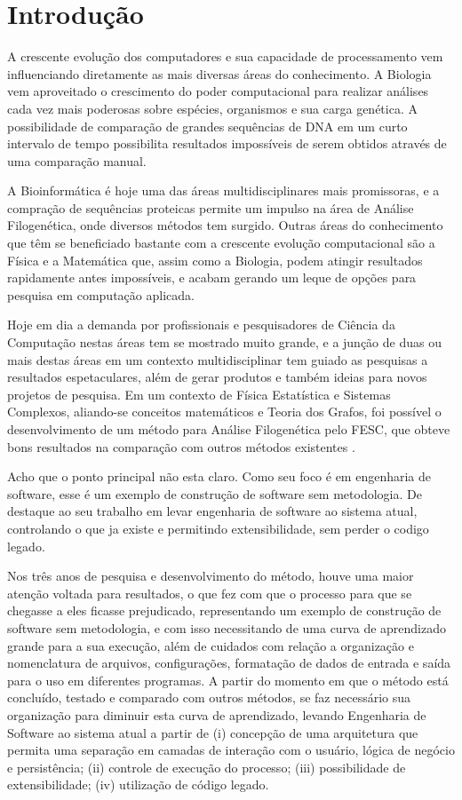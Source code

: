 \chapter{Introdução}

A crescente evolução dos computadores e sua capacidade de processamento vem influenciando diretamente as mais diversas áreas do conhecimento. A Biologia
vem aproveitado o crescimento do poder computacional para realizar análises cada vez mais poderosas sobre espécies, organismos e sua carga genética.
A possibilidade de comparação de grandes sequências de DNA em um curto intervalo de tempo possibilita resultados impossíveis de serem obtidos através
de uma comparação manual.

A Bioinformática é hoje uma das áreas multidisciplinares mais promissoras, e a compração de sequências proteicas permite um impulso na área de Análise
Filogenética, onde diversos métodos tem surgido. Outras áreas do conhecimento que têm se beneficiado bastante com a crescente evolução computacional são a
Física e a Matemática que, assim como a Biologia, podem atingir resultados rapidamente antes impossíveis, e acabam gerando um leque de opções para pesquisa
em computação aplicada.

Hoje em dia a demanda por profissionais e pesquisadores de Ciência da Computação nestas áreas tem se mostrado muito grande, e a junção de duas ou mais destas
áreas em um contexto multidisciplinar tem guiado as pesquisas a resultados espetaculares, além de gerar produtos e também ideias para novos projetos de
pesquisa. Em um contexto de Física Estatística e Sistemas Complexos, aliando-se conceitos matemáticos \cite{andrade2009} e Teoria dos Grafos, foi possível o
desenvolvimento de um método para Análise Filogenética pelo FESC, que obteve bons resultados na comparação com outros métodos existentes \cite{andrade2011}.


Acho que o ponto principal não esta claro. Como seu foco é em engenharia de software, esse é um exemplo de construção de software sem metodologia.
De destaque ao seu trabalho em levar engenharia de software ao sistema atual, controlando o que ja existe e permitindo extensibilidade, sem perder
o codigo legado.


Nos três anos de pesquisa e desenvolvimento do método, houve uma maior atenção voltada para resultados, o que fez com que o processo para que se chegasse
a eles ficasse prejudicado, representando um exemplo de construção de software sem metodologia, e com isso necessitando de uma curva de aprendizado grande
para a sua execução, além de cuidados com relação a organização e nomenclatura de arquivos, configurações, formatação de dados de entrada e saída para o
uso em diferentes programas. A partir do momento em que o método está concluído, testado e comparado com outros métodos, se faz necessário sua organização
para diminuir esta curva de aprendizado, levando Engenharia de Software ao sistema atual a partir de (i) concepção de uma arquitetura que permita uma
separação em camadas de interação com o usuário, lógica de negócio e persistência; (ii) controle de execução do processo; (iii) possibilidade de
extensibilidade; (iv) utilização de código legado.

